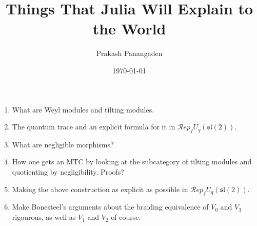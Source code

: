 \documentclass[10pt]{article}
\begin{document}

\title{Things That Julia Will Explain to the World}
\author{Prakash Panangaden}
\date{\today}
\maketitle

\begin{enumerate}
\item What are Weyl modules and tilting modules.
\item The quantum trace and an explicit formula for it in
  $\mathcal{R}ep_fU_q(\mathfrak{sl}(2))$.
\item What are negligible morphisms?
\item How one gets an MTC by looking at the subcategory of tilting modules
  and quotienting by negligibility.  Proofs?
\item Making the above construction as explicit as possible in
  $\mathcal{R}ep_fU_q(\mathfrak{sl}(2))$.
\item Make Bonesteel's arguments about the braiding equivalence of $V_0$
  and $V_3$ rigourous, as well as $V_1$ and $V_2$ of course.
\end{enumerate}
\end{document}
